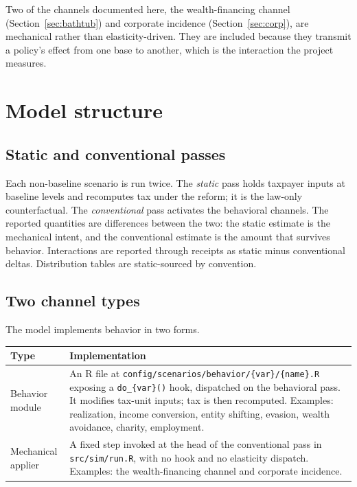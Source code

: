 \documentclass[11pt]{article}
\newcommand{\code}[1]{\texttt{\small #1}}
\begin{document}
Two of the channels documented here, the wealth-financing channel
(Section~\ref{sec:bathtub}) and corporate incidence
(Section~\ref{sec:corp}), are mechanical rather than elasticity-driven. They are
included because they transmit a policy's effect from one base to another, which
is the interaction the project measures.

\section{Model structure}
\label{sec:structure}

\subsection{Static and conventional passes}
Each non-baseline scenario is run twice. The \emph{static} pass holds taxpayer
inputs at baseline levels and recomputes tax under the reform; it is the
law-only counterfactual. The \emph{conventional} pass activates the behavioral
channels. The reported quantities are differences between the two: the static
estimate is the mechanical intent, and the conventional estimate is the amount
that survives behavior. Interactions are reported through receipts as static
minus conventional deltas. Distribution tables are static-sourced by convention.

\subsection{Two channel types}
\label{sec:types}
The model implements behavior in two forms.

\begin{table}[h]
\centering
\small
\begin{tabular}{@{}p{}p{}@{}}
\toprule
\textbf{Type} & \textbf{Implementation} \\
\midrule
Behavior module &
An R file at \code{config/scenarios/behavior/\{var\}/\{name\}.R} exposing a
\code{do_\{var\}()} hook, dispatched on the behavioral pass. It modifies
tax-unit inputs; tax is then recomputed. Examples: realization, income
conversion, entity shifting, evasion, wealth avoidance, charity, employment. \\
\addlinespace
Mechanical applier &
A fixed step invoked at the head of the conventional pass in
\code{src/sim/run.R}, with no hook and no elasticity dispatch. Examples: the
wealth-financing channel and corporate incidence. \\
\bottomrule
\end{tabular}
\end{table}
\end{document}
